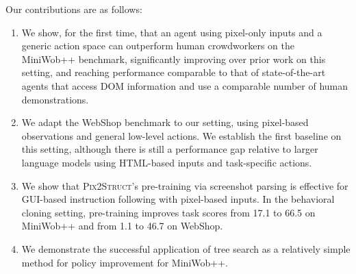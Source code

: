 Our contributions are as follows:
\begin{enumerate}[leftmargin=*,topsep=1pt]
\item We show, for the first time, that an agent using pixel-only inputs and a generic action space can outperform human crowdworkers on the MiniWob++ benchmark, significantly improving over prior work on this setting, and reaching performance comparable to that of state-of-the-art agents that access DOM information and use a comparable number of human demonstrations.
\item We adapt the WebShop benchmark to our setting, using pixel-based observations and general low-level actions. We establish the first baseline
on this setting, although there is still a performance gap relative to larger language models using HTML-based inputs and task-specific actions.
\item We show that \textsc{Pix2Struct}'s pre-training via screenshot parsing is effective for GUI-based instruction following with pixel-based inputs. In the behavioral cloning setting, pre-training improves task scores from 17.1 to 66.5 on MiniWob++ and from 1.1 to 46.7 on WebShop. 
\item We demonstrate the successful application of tree search as a relatively simple method for policy improvement for MiniWob++.
\end{enumerate}

